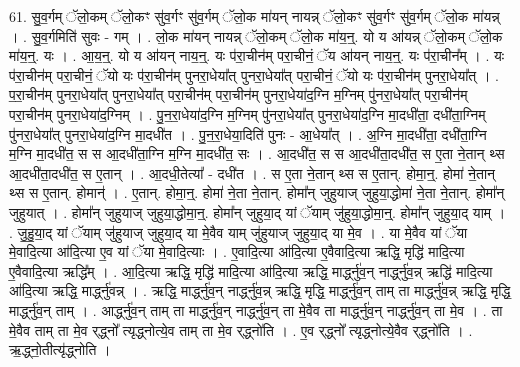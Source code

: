 \documentclass[17pt]{extarticle}
\begin{document}
61. सु॒व॒र्गम् ॅलो॒कम् ॅलो॒कꣳ सु॑व॒र्गꣳ सु॑व॒र्गम् ॅलो॒क मा॑यन् नायन्न् ॅलो॒कꣳ सु॑व॒र्गꣳ सु॑व॒र्गम् ॅलो॒क मा॑यन्न् । . सु॒व॒र्गमिति॑ सुवः - गम् । . लो॒क मा॑यन् नायन्न् ॅलो॒कम् ॅलो॒क मा॑य॒न्॒. यो य आ॑यन्न् ॅलो॒कम् ॅलो॒क मा॑य॒न्॒. यः । . आ॒य॒न्॒. यो य आ॑यन् नाय॒न्॒. यः प॑रा॒चीन॑म् परा॒चीनं॒ ॅय आ॑यन् नाय॒न्॒. यः प॑रा॒चीन᳚म् । . यः प॑रा॒चीन॑म् परा॒चीनं॒ ॅयो यः प॑रा॒चीन॑म् पुनरा॒धेया᳚त् पुनरा॒धेया᳚त् परा॒चीनं॒ ॅयो यः प॑रा॒चीन॑म् पुनरा॒धेया᳚त् । . प॒रा॒चीन॑म् पुनरा॒धेया᳚त् पुनरा॒धेया᳚त् परा॒चीन॑म् परा॒चीन॑म् पुनरा॒धेया॑द॒ग्नि म॒ग्निम् पु॑नरा॒धेया᳚त् परा॒चीन॑म् परा॒चीन॑म् पुनरा॒धेया॑द॒ग्निम् । . पु॒न॒रा॒धेया॑द॒ग्नि म॒ग्निम् पु॑नरा॒धेया᳚त् पुनरा॒धेया॑द॒ग्नि मा॒दधी॑ता॒ दधी॑ता॒ग्निम् पु॑नरा॒धेया᳚त् पुनरा॒धेया॑द॒ग्नि मा॒दधी॑त । . पु॒न॒रा॒धेया॒दिति॑ पुनः - आ॒धेया᳚त् । . अ॒ग्नि मा॒दधी॑ता॒ दधी॑ता॒ग्नि म॒ग्नि मा॒दधी॑त॒ स स आ॒दधी॑ता॒ग्नि म॒ग्नि मा॒दधी॑त॒ सः । . आ॒दधी॑त॒ स स आ॒दधी॑ता॒दधी॑त॒ स ए॒ता ने॒तान् थ्स आ॒दधी॑ता॒दधी॑त॒ स ए॒तान् । . आ॒दधी॒तेत्या᳚ - दधी॑त । . स ए॒ता ने॒तान् थ्स स ए॒तान्. होमा॒न्॒. होमा॑ ने॒तान् थ्स स ए॒तान्. होमान्॑ । . ए॒तान्. होमा॒न्॒. होमा॑ ने॒ता ने॒तान्. होमा᳚न् जुहुयाज् जुहुया॒द्धोमा॑ ने॒ता ने॒तान्. होमा᳚न् जुहुयात् । . होमा᳚न् जुहुयाज् जुहुया॒द्धोमा॒न्॒. होमा᳚न् जुहुया॒द् यां ॅयाम् जु॑हुया॒द्धोमा॒न्॒. होमा᳚न् जुहुया॒द् याम् । . जु॒हु॒या॒द् यां ॅयाम् जु॑हुयाज् जुहुया॒द् या मे॒वैव याम् जु॑हुयाज् जुहुया॒द् या मे॒व । . या मे॒वैव यां ॅया मे॒वादि॒त्या आ॑दि॒त्या ए॒व यां ॅया मे॒वादि॒त्याः । . ए॒वादि॒त्या आ॑दि॒त्या ए॒वैवादि॒त्या ऋद्धि॒ मृद्धि॑ मादि॒त्या ए॒वैवादि॒त्या ऋद्धि᳚म् । . आ॒दि॒त्या ऋद्धि॒ मृद्धि॑ मादि॒त्या आ॑दि॒त्या ऋद्धि॒ मार्द्ध्नु॑व॒न् नार्द्ध्नु॑व॒न्न् ऋद्धि॑ मादि॒त्या आ॑दि॒त्या ऋद्धि॒ मार्द्ध्नु॑वन्न् । . ऋद्धि॒ मार्द्ध्नु॑व॒न् नार्द्ध्नु॑व॒न्न् ऋद्धि॒ मृद्धि॒ मार्द्ध्नु॑व॒न् ताम् ता मार्द्ध्नु॑व॒न्न् ऋद्धि॒ मृद्धि॒ मार्द्ध्नु॑व॒न् ताम् । . आर्द्ध्नु॑व॒न् ताम् ता मार्द्ध्नु॑व॒न् नार्द्ध्नु॑व॒न् ता मे॒वैव ता मार्द्ध्नु॑व॒न् नार्द्ध्नु॑व॒न् ता मे॒व । . ता मे॒वैव ताम् ता मे॒व र्‌द्ध्नो᳚ त्यृद्ध्नोत्ये॒व ताम् ता मे॒व र्‌द्ध्नो॑ति । . ए॒व र्‌द्ध्नो᳚ त्यृद्ध्नोत्ये॒वैव र्‌द्ध्नो॑ति । . ऋ॒द्ध्नो॒तीत्यृ॑द्ध्नोति । \newline
\pagebreak
{}
\end{document}
